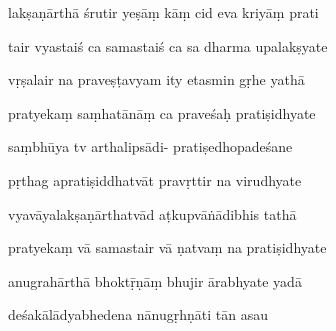 \documentclass[article,12pt,a4paper]{memoir}%
\newcounter{parCount}
\begin{document}
	  
	  \pstart {} lakṣaṇārthā śrutir yeṣāṃ kāṃ cid eva kriyāṃ prati 
	{}
	\pend%
      

	  
	  \pstart \leavevmode%
	tair vyastaiś ca samastaiś ca sa dharma upalakṣyate 
	{}
	\pend%
      

	  
	  \pstart {} vṛṣalair na praveṣṭavyam ity etasmin gṛhe yathā 
	{}
	\pend%
      

	  
	  \pstart \leavevmode%
	pratyekaṃ saṃhatānāṃ ca praveśaḥ pratiṣidhyate 
	{}
	\pend%
      

	  
	  \pstart {} saṃbhūya tv arthalipsādi- pratiṣedhopadeśane 
	{}
	\pend%
      

	  
	  \pstart \leavevmode%
	pṛthag apratiṣiddhatvāt pravṛttir na virudhyate 
	{}
	\pend%
      

	  
	  \pstart {} vyavāyalakṣaṇārthatvād aṭkupvāṅādibhis tathā 
	{}
	\pend%
      

	  
	  \pstart \leavevmode%
	pratyekaṃ vā samastair vā ṇatvaṃ na pratiṣidhyate 
	{}
	\pend%
      

	  
	  \pstart {} anugrahārthā bhoktṝṇāṃ bhujir ārabhyate yadā 
	{}
	\pend%
      

	  
	  \pstart \leavevmode%
	deśakālādyabhedena nānugṛhṇāti tān asau 
	{}
	\pend%
      
\end{document}
